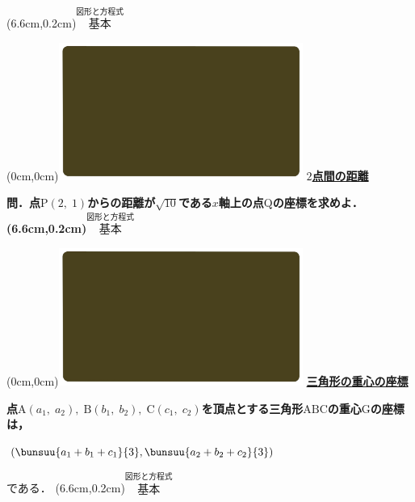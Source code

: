 \documentclass[10pt,
fleqn,
dvipdfmx,
uplatex
]{jsarticle}
\begin{document}
\at(6.6cm,0.2cm){\small\color{bradorange}$\overset{\text{図形と方程式}}{\text{基本}}$}


\newpage



\at(0cm,0cm){\includegraphics[width=8cm,bb=0 0 1920 1080]{./youtube/thumbnails/templates/smart_background/図形と方程式.jpeg}}
{\color{orange}\bf\boldmath\huge\underline{$2$点間の距離}}\vspace{0.3zw}

\LARGE 
\bf\boldmath 問．点$\text{P}\left(2,\;1\right)$からの距離が$\sqrt {10}$である$x$軸上の点$\text{Q}$の座標を求めよ．
\at(6.6cm,0.2cm){\small\color{bradorange}$\overset{\text{図形と方程式}}{\text{基本}}$}


\newpage



\at(0cm,0cm){\includegraphics[width=8cm,bb=0 0 1920 1080]{./youtube/thumbnails/templates/smart_background/図形と方程式.jpeg}}
{\color{orange}\bf\boldmath\huge\underline{三角形の重心の座標}}\vspace{0.3zw}

\normalsize
\bf\boldmath 点$\text{A}\left(a_1,\;a_2\right),\;\text{B}\left(b_1,\;b_2\right),\;\text{C}\left(c_1,\;c_2\right)$を頂点とする三角形$\text{ABC}$の重心$\text{G}$の座標は，

\Large
\vspace{0.4zw}
\hspace{0zw}
$\left(\bunsuu{a_1+b_1+c_1}{3},\bunsuu{a_2+b_2+c_2}{3}\right)$

\large
\vspace{0.4zw}
\hfill
である．
\at(6.6cm,0.2cm){\small\color{bradorange}$\overset{\text{図形と方程式}}{\text{基本}}$}
\end{document}
